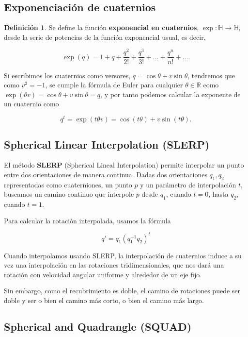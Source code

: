 \documentclass{article}
\theoremstyle{plain}
\theoremstyle{definition}
\newtheorem{definition}{Definición}
\theoremstyle{remark}
\begin{document}
\subsection{Exponenciación de cuaternios}
\begin{definition}
  Se define la función \textbf{exponencial en cuaternios}, $\exp \colon \mathbb{H} \to \mathbb{H}$, desde
  la serie de potencias de la función exponencial usual, es decir,

  \[
    \exp(q) =  1 + q + \frac{q^2}{2!} + \frac{q^3}{3!} + \dots + \frac{q^n}{n!} + \dots .
  \]
\end{definition}

Si escribimos los cuaternios como versores, $q = \cos \theta + v \sin \theta$, tendremos que
como $v^2 = -1$, se cumple la fórmula de Euler para cualquier $\theta \in \mathbb{R}$ como
$\exp(\theta v) = \cos \theta + v \sin \theta = q$,
y por tanto podemos calcular la exponente de un cuaternio como

\[
  q^t = \exp(t \theta v) = \cos (t \theta) + v \sin (t \theta).
\]

\subsection{Spherical Linear Interpolation (SLERP)}
El método \textbf{SLERP} (Spherical Lineal Interpolation) permite interpolar
un punto entre dos orientaciones de manera continua. Dadas dos orientaciones
$q_1,q_2$ representadas como cuaterniones, un punto $p$ y un parámetro de
interpolación $t$, buscamos un camino continuo que interpole $p$ desde $q_1$,
cuando $t=0$, hasta $q_2$, cuando $t=1$.

Para calcular la rotación interpolada, usamos la fórmula

\[q' = q_1(q_1^{-1}q_2)^t\]

Cuando interpolamos usando SLERP, la interpolación de cuaternios induce a
su vez una interpolación en las rotaciones tridimensionales, que nos dará
una rotación con velocidad angular uniforme y alrededor de un eje fijo.

Sin embargo, como el recubrimiento es doble, el camino de rotaciones puede
ser doble y ser o bien el camino más corto, o bien el camino más largo.


\subsection{Spherical and Quadrangle (SQUAD)}
\end{document}
